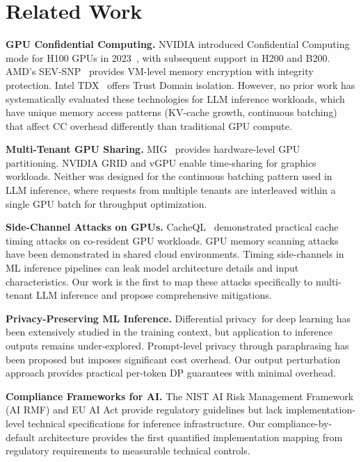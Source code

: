 \documentclass[conference,10pt]{IEEEtran}
\begin{document}
\section{Related Work}
\label{sec:related}

\textbf{GPU Confidential Computing.} NVIDIA introduced Confidential Computing mode for H100 GPUs in 2023~\cite{nvidia2024cc}, with subsequent support in H200 and B200. AMD's SEV-SNP~\cite{amd2024sevsnp} provides VM-level memory encryption with integrity protection. Intel TDX~\cite{intel2024tdx} offers Trust Domain isolation. However, no prior work has systematically evaluated these technologies for LLM inference workloads, which have unique memory access patterns (KV-cache growth, continuous batching) that affect CC overhead differently than traditional GPU compute.

\textbf{Multi-Tenant GPU Sharing.} MIG~\cite{nvidia2024mig} provides hardware-level GPU partitioning. NVIDIA GRID and vGPU enable time-sharing for graphics workloads. Neither was designed for the continuous batching pattern used in LLM inference, where requests from multiple tenants are interleaved within a single GPU batch for throughput optimization.

\textbf{Side-Channel Attacks on GPUs.} CacheQL~\cite{cacheql2024} demonstrated practical cache timing attacks on co-resident GPU workloads. GPU memory scanning attacks have been demonstrated in shared cloud environments. Timing side-channels in ML inference pipelines can leak model architecture details and input characteristics. Our work is the first to map these attacks specifically to multi-tenant LLM inference and propose comprehensive mitigations.

\textbf{Privacy-Preserving ML Inference.} Differential privacy~for deep learning has been extensively studied in the training context, but application to inference outputs remains under-explored. Prompt-level privacy through paraphrasing has been proposed but imposes significant cost overhead. Our output perturbation approach provides practical per-token DP guarantees with minimal overhead.

\textbf{Compliance Frameworks for AI.} The NIST AI Risk Management Framework (AI RMF) and EU AI Act provide regulatory guidelines but lack implementation-level technical specifications for inference infrastructure. Our compliance-by-default architecture provides the first quantified implementation mapping from regulatory requirements to measurable technical controls.
\end{document}
